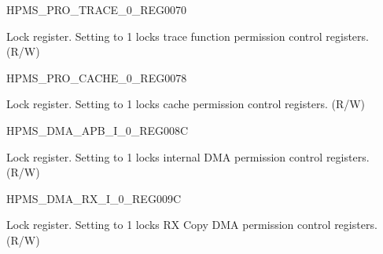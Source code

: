 \begin{register}{H}{PMS\_PRO\_TRACE\_0\_REG}{\hexprefix{}0070}\label{regdesc:PMSPROTRACE0REG}
%
%
\regnewline%
\begin{regdesc}\begin{reglist}
\label{fielddesc:PMSPROTRACELOCK}\item [PMS\_PRO\_TRACE\_LOCK] Lock register. Setting to 1 locks trace function permission control registers. (R/W)
\end{reglist}\end{regdesc}
\end{register}


\begin{register}{H}{PMS\_PRO\_CACHE\_0\_REG}{\hexprefix{}0078}\label{regdesc:PMSPROCACHE0REG}
%
%
\regnewline%
\begin{regdesc}\begin{reglist}
\label{fielddesc:PMSPROCACHELOCK}\item [PMS\_PRO\_CACHE\_LOCK] Lock register. Setting to 1 locks cache permission control registers. (R/W)
\end{reglist}\end{regdesc}
\end{register}


\begin{register}{H}{PMS\_DMA\_APB\_I\_0\_REG}{\hexprefix{}008C}\label{regdesc:PMSDMAAPBI0REG}
%
%
\regnewline%
\begin{regdesc}\begin{reglist}
\label{fielddesc:PMSDMAAPBILOCK}\item [PMS\_DMA\_APB\_I\_LOCK] Lock register. Setting to 1 locks internal DMA permission control registers. (R/W)
\end{reglist}\end{regdesc}
\end{register}


\begin{register}{H}{PMS\_DMA\_RX\_I\_0\_REG}{\hexprefix{}009C}\label{regdesc:PMSDMARXI0REG}
%
%
\regnewline%
\begin{regdesc}\begin{reglist}
\label{fielddesc:PMSDMARXILOCK}\item [PMS\_DMA\_RX\_I\_LOCK] Lock register. Setting to 1 locks RX Copy DMA permission control registers. (R/W)
\end{reglist}\end{regdesc}
\end{register}


